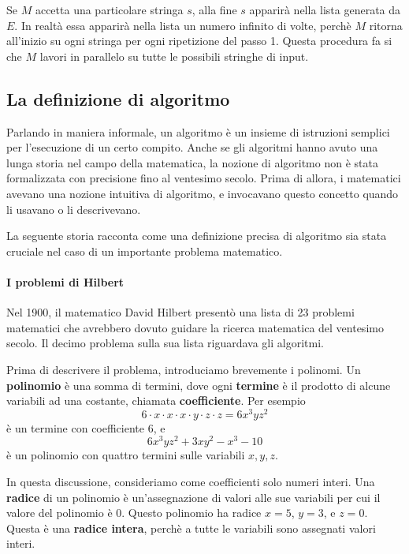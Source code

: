 \documentclass{article}
\begin{document}
Se $M$ accetta una particolare stringa $s$, alla fine $s$ apparirà nella lista generata da $E$.
In realtà essa apparirà nella lista un numero infinito di volte, perchè $M$ ritorna all'inizio su ogni stringa per ogni ripetizione del passo 1.
Questa procedura fa si che $M$ lavori in parallelo su tutte le possibili stringhe di input.


\subsection{La definizione di algoritmo}

Parlando in maniera informale, un algoritmo è un insieme di istruzioni semplici per l'esecuzione di un certo compito.
Anche se gli algoritmi hanno avuto una lunga storia nel campo della matematica, la nozione di algoritmo non è stata formalizzata con precisione fino al ventesimo secolo.
Prima di allora, i matematici avevano una nozione intuitiva di algoritmo, e invocavano questo concetto quando li usavano o li descrivevano.

La seguente storia racconta come una definizione precisa di algoritmo sia stata cruciale nel caso di un importante problema matematico.

\paragraph{I problemi di Hilbert}
\label{def:hilbert_problems}
\text{ }

Nel 1900, il matematico David Hilbert presentò una lista di 23 problemi matematici che avrebbero dovuto guidare la ricerca matematica del ventesimo secolo.
Il decimo problema sulla sua lista riguardava gli algoritmi.

Prima di descrivere il problema, introduciamo brevemente i polinomi.
Un \textbf{polinomio} è una somma di termini, dove ogni \textbf{termine} è il prodotto di alcune variabili ad una costante, chiamata \textbf{coefficiente}.
Per esempio
$$
6 \cdot x \cdot x \cdot x \cdot y \cdot z \cdot z = 6x^3yz^2
$$
è un termine con coefficiente 6, e 
$$
6x^3yz^2 + 3xy^2 - x^3 - 10
$$
è un polinomio con quattro termini sulle variabili $x,y,z$.

In questa discussione, consideriamo come coefficienti solo numeri interi.
Una \textbf{radice} di un polinomio è un'assegnazione di valori alle sue variabili per cui il valore del polinomio è 0.
Questo polinomio ha radice $x = 5$, $y = 3$, e $z = 0$.
Questa è una \textbf{radice intera}, perchè a tutte le variabili sono assegnati valori interi.
\newline
\end{document}
